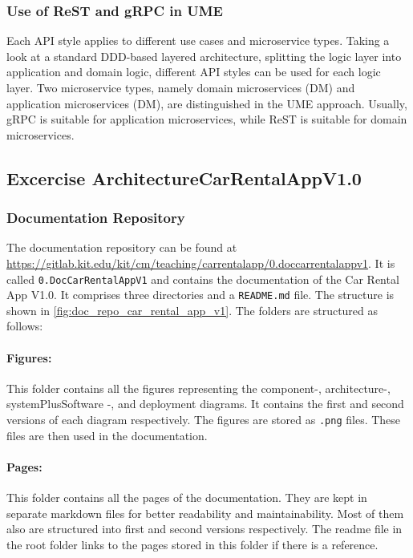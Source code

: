 \subsubsection*{Use of ReST and gRPC in UME}
Each API style applies to different use cases and microservice types.
Taking a look at a standard DDD-based layered architecture, splitting the logic layer into application and domain logic, different API styles can be used for each logic layer.
Two microservice types, namely domain microservices (DM) and application microservices (DM), are distinguished in the UME approach.
Usually, gRPC is suitable for application microservices, while ReST is suitable for domain microservices.

\subsection{Excercise ArchitectureCarRentalAppV1.0}
\label{sec:architecture_car_rental_app_v1_0}
\subsubsection*{Documentation Repository}
The documentation repository can be found at \url{https://gitlab.kit.edu/kit/cm/teaching/carrentalapp/0.doccarrentalappv1}.
It is called \texttt{0.DocCarRentalAppV1} and contains the documentation of the Car Rental App V1.0.
It comprises three directories and a \texttt{README.md} file.
The structure is shown in \autoref{fig:doc_repo_car_rental_app_v1}.
The folders are structured as follows:

\paragraph*{Figures:}
This folder contains all the figures representing the component-, architecture-, systemPlusSoftware -, and deployment diagrams.
It contains the first and second versions of each diagram respectively.
The figures are stored as \texttt{.png} files.
These files are then used in the documentation.
\paragraph*{Pages:}
This folder contains all the pages of the documentation.
They are kept in separate markdown files for better readability and maintainability.
Most of them also are structured into first and second versions respectively.
The readme file in the root folder links to the pages stored in this folder if there is a reference.
